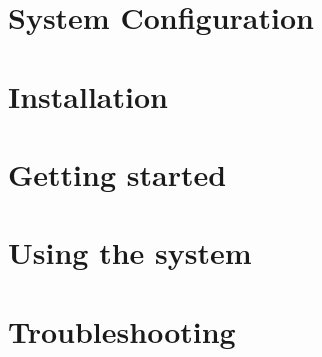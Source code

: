\documentclass[11pt,a4paper,titlepage]{article}
\begin{document}
\section{System Configuration}

\section{Installation}
		
\section{Getting started}

\section{Using the system}

\section{Troubleshooting}
\end{document}
